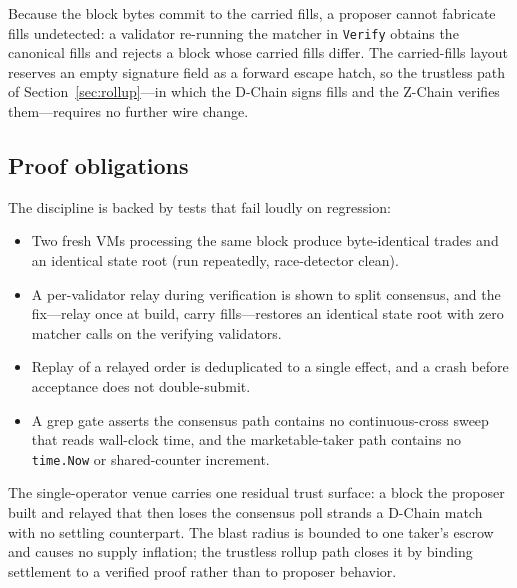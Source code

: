 \begin{remark}
Because the block bytes commit to the carried fills, a proposer cannot fabricate fills
undetected: a validator re-running the matcher in \texttt{Verify} obtains the canonical
fills and rejects a block whose carried fills differ. The carried-fills layout reserves an
empty signature field as a forward escape hatch, so the trustless path of
Section~\ref{sec:rollup}---in which the D-Chain signs fills and the Z-Chain verifies
them---requires no further wire change.
\end{remark}

\subsection{Proof obligations}

The discipline is backed by tests that fail loudly on regression:

\begin{itemize}
  \item Two fresh VMs processing the same block produce byte-identical trades and an
  identical state root (run repeatedly, race-detector clean).
  \item A per-validator relay during verification is shown to split consensus, and the
  fix---relay once at build, carry fills---restores an identical state root with zero
  matcher calls on the verifying validators.
  \item Replay of a relayed order is deduplicated to a single effect, and a crash before
  acceptance does not double-submit.
  \item A grep gate asserts the consensus path contains no continuous-cross sweep that
  reads wall-clock time, and the marketable-taker path contains no \texttt{time.Now} or
  shared-counter increment.
\end{itemize}

The single-operator venue carries one residual trust surface: a block the proposer built
and relayed that then loses the consensus poll strands a D-Chain match with no settling
counterpart. The blast radius is bounded to one taker's escrow and causes no supply
inflation; the trustless rollup path closes it by binding settlement to a verified proof
rather than to proposer behavior.
